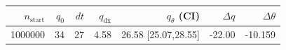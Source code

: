 \begin{tabular}{r r r r r r r}
\hline
$n_{\mathrm{start}}$ & $q_0$ & $dt$ & $q_{\mathrm{dx}}$ & $q_{\theta}$ (CI) & $\Delta q$ & $\Delta\theta$ \\
\hline
1000000 & 34 & 27 & 4.58 & 26.58 [25.07,28.55] & -22.00 & -10.159 \\
\hline
\end{tabular}
